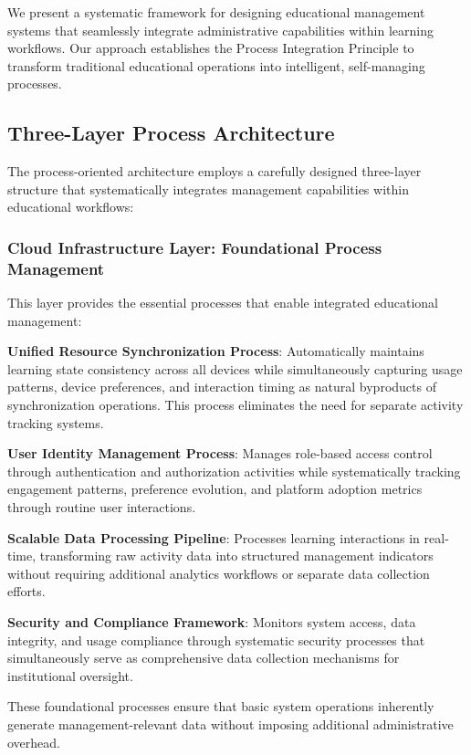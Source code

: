 \documentclass[conference]{IEEEtran}
\begin{document}
We present a systematic framework for designing educational management systems that seamlessly integrate administrative capabilities within learning workflows. Our approach establishes the Process Integration Principle to transform traditional educational operations into intelligent, self-managing processes.

\subsection{Three-Layer Process Architecture}

The process-oriented architecture employs a carefully designed three-layer structure that systematically integrates management capabilities within educational workflows:

\subsubsection{Cloud Infrastructure Layer: Foundational Process Management}
This layer provides the essential processes that enable integrated educational management:

\textbf{Unified Resource Synchronization Process}: Automatically maintains learning state consistency across all devices while simultaneously capturing usage patterns, device preferences, and interaction timing as natural byproducts of synchronization operations. This process eliminates the need for separate activity tracking systems.

\textbf{User Identity Management Process}: Manages role-based access control through authentication and authorization activities while systematically tracking engagement patterns, preference evolution, and platform adoption metrics through routine user interactions.

\textbf{Scalable Data Processing Pipeline}: Processes learning interactions in real-time, transforming raw activity data into structured management indicators without requiring additional analytics workflows or separate data collection efforts.

\textbf{Security and Compliance Framework}: Monitors system access, data integrity, and usage compliance through systematic security processes that simultaneously serve as comprehensive data collection mechanisms for institutional oversight.

These foundational processes ensure that basic system operations inherently generate management-relevant data without imposing additional administrative overhead.
\end{document}
